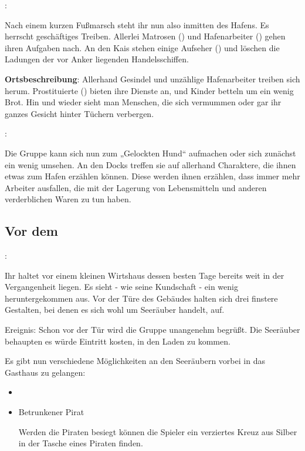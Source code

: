 
:

Nach einem kurzen Fußmarsch steht ihr nun also inmitten des Hafens. Es herrscht geschäftiges Treiben. Allerlei Matrosen (\blue{\ref{Matrosen}}) und Hafenarbeiter (\blue{\ref{Hafenarbeiter}}) gehen ihren Aufgaben nach. An den Kais stehen einige Aufseher (\blue{\ref{Aufseher}}) und löschen die Ladungen der vor Anker liegenden Handelsschiffen.

\textbf{Ortsbeschreibung}: Allerhand Gesindel und unzählige Hafenarbeiter treiben sich herum. Prostituierte (\blue{\ref{Prostituierte}}) bieten ihre Dienste an, und Kinder betteln um ein wenig Brot. Hin und wieder sieht man Menschen, die sich vermummen oder gar ihr ganzes Gesicht hinter Tüchern verbergen.

:

Die Gruppe kann sich nun zum „Gelockten Hund“ aufmachen oder sich zunächst ein wenig umsehen. An den Docks treffen sie auf allerhand Charaktere, die ihnen etwas zum Hafen erzählen können.
Diese werden ihnen erzählen, dass immer mehr Arbeiter ausfallen, die mit der Lagerung von Lebensmitteln und anderen verderblichen Waren zu tun haben.

\subsection{Vor dem }
\label{vorhund}

:

Ihr haltet vor einem kleinen Wirtshaus dessen besten Tage bereits weit in der Vergangenheit liegen. Es sieht - wie seine Kundschaft - ein wenig heruntergekommen aus. Vor der Türe des Gebäudes halten sich drei finstere Gestalten, bei denen es sich wohl um Seeräuber handelt, auf.

Ereignis: Schon vor der Tür wird die Gruppe unangenehm begrüßt. Die Seeräuber behaupten es würde Eintritt kosten, in den Laden zu kommen.

Es gibt nun verschiedene Möglichkeiten an den Seeräubern vorbei in das Gasthaus zu gelangen:

\begin{itemize}
  \item {} \\
  \item \textbf{} Betrunkener Pirat \\
\begin{center}
  
\end{center}

Werden die Piraten besiegt können die Spieler ein verziertes Kreuz aus Silber in der Tasche eines Piraten finden.

\end{itemize}

